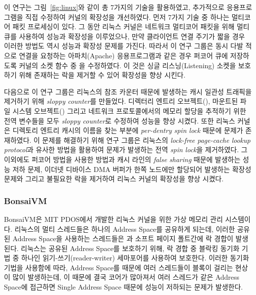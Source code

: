 이 연구는 그림~\ref{fig:linux}와 같이 총 7가지의 기술을 활용하였고, 추가적으로 응용프로그램을 직접 수정하여 
커널의 확장성을 개선하였다.
먼저 7가지 기술 중 하나는 멀티코어 패킷 프로세싱이 있다. 
그 동안 리눅스 커널은 네트워크 멀티코어 패킷을 위해 멀티 큐를 사용하여 성능과 확장성을 이루었으나, 
만약 클라이언트 연결 주기가 짧을 경우 이러한 방법도 역시 성능과 확장성 문제를 가진다.
따라서 이 연구 그룹은 동시 다발 적으로 연결을 요청하는 아파치(Apache) 응용프로그램과 같은 경우 
퍼코어 큐에 저장하도록 커널의 소켓 함수 중 을 수정하였다. 
이 것은 싱글 리스닝(Listening) 소켓을 보호하기 위해 존재하는 락을 제거할 수 있어 확장성을 향상 시킨다.

다음으로 이 연구 그룹은 리눅스의 참조 카운터 때문에 발생하는 캐시 일관성 트래픽을 제거하기 위해
\textit{sloppy counter}를 만들었다. 
디렉터리 엔트리 오브젝트(), 마운트된 파일 시스템 오브젝트() 그리고 
네트워크 프로토콜에서의 메모리 할당을 추적하기 위한 전역 변수들을 모두 \textit{sloppy counter}로 수정하여 
성능을 향상 시켰다.
또한 리눅스 커널은 디렉토리 엔트리 캐시의 이름을 찾는 부분에 \textit{per-dentry spin lock} 때문에 문제가
존재하였다.
이 문제를 해결하기 위해 연구 그룹은 리눅스의 \textit{lock-free page-cache lookup protocol}과
유사한 방법을 활용하여 문제가 발생하는 전역 \textit{spin lock}을 제거하였다.
그 이외에도 퍼코어 방법을 사용한 방법과 캐시 라인의 \textit{false sharing} 때문에 발생하는 성능 저하 문제, 
이더넷 디바이스 DMA 버퍼가 한쪽 노드에만 할당되어 발생하는 확장성 문제와 그리고 불필요한 락을 
제거하여 리눅스 커널의 확장성을 향상 시켰다.  

\subsubsection{BonsaiVM}
BonsaiVM은 MIT PDOS에서 개발한 리눅스 커널을 위한 가상 메모리 관리 시스템이다. 
리눅스의 멀티 스레드들은 하나의 Address Space를 공유하게 되는데, 이러한 공유된 Address Space을 사용하는 
스레드들은 과 소프트 페이지 폴트간에 락 경합이 발생된다.
리눅스는 공유된 Address Space를 보호하기 위해, 락 경합 중 블락킹 동기화 기법 중 하나인
읽기-쓰기(reader-writer) 세마포어를 사용하여 보호한다.
이러한 동기화 기법을 사용함에 따라, Address Space를 때문에 여러 스레드들이 블록이 걸리는 현상이 많이 발생하는데, 
이 때문에 결국 코어가 많아져서 여러 스레드가 같은 Address Space에 접근하면 Single Address Space 때문에 성능이
저하되는 문제가 발생한다.

